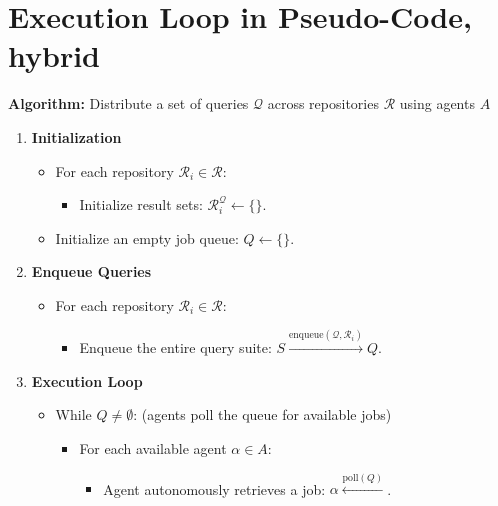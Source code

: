 \documentclass[11pt]{article}
\begin{document}
\FloatBarrier

\section{Execution Loop in Pseudo-Code, hybrid}
\label{sec:orgb767ab2}
{\textbf{Algorithm:} Distribute a set of queries \(\mathcal{Q}\) across repositories \(\mathcal{R}\) using agents \(A\)}

\begin{enumerate}
\item \textbf{\textbf{Initialization}}
  \begin{itemize}
  \item For each repository \(\mathcal{R}_i \in \mathcal{R}\):
    \begin{itemize}
    \item Initialize result sets: \(\mathcal{R}_i^{\mathcal{Q}} \gets \{\}\).
    \end{itemize}
  \item Initialize an empty job queue: \(Q \gets \{\}\).
  \end{itemize}

\item \textbf{\textbf{Enqueue Queries}}
  \begin{itemize}
  \item For each repository \(\mathcal{R}_i \in \mathcal{R}\):
    \begin{itemize}
    \item Enqueue the entire query suite: \(S \xrightarrow{\text{enqueue}(\mathcal{Q}, \mathcal{R}_i)} Q\).
    \end{itemize}
  \end{itemize}

\item \textbf{\textbf{Execution Loop}}
  \begin{itemize}
  \item While \(Q \neq \emptyset\): (agents poll the queue for available jobs)
    \begin{itemize}
    \item For each available agent \(\alpha \in A\):
      \begin{itemize}
      \item Agent autonomously retrieves a job: \(\alpha \xleftarrow{\text{poll}(Q)}\).


\end{itemize}
\end{itemize}
\end{itemize}
\end{enumerate}
\end{document}
